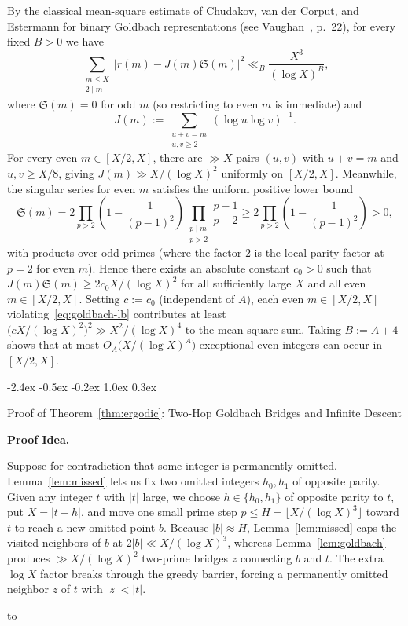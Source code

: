 \documentclass[11pt,a4paper]{article}
\makeatletter
\renewcommand{\section}{\@startsection{section}{1}{\z@}%
  {-2.4ex \@plus -0.5ex \@minus -0.2ex}%
  {1.0ex \@plus 0.3ex}%
  {\Large\bfseries\sffamily\color{ink}\raggedright}}
\theoremstyle{entheorem}
\theoremstyle{enremark}
\renewenvironment{proof}[1][\proofname]{\par
  \pushQED{\qed}%
  \normalfont\topsep5\p@\@plus4\p@\relax
  \trivlist
  \item[\hskip\labelsep\bfseries\sffamily\color{ink}#1\@addpunct{.}]\ignorespaces
}{%
  \popQED\endtrivlist\@endpefalse
}
\newenvironment{ideabox}[1][Proof Idea]{%
  \par\vspace{0.35em}\noindent
  \begin{lrbox}{\ideastore}%
    \begin{minipage}{\dimexpr\linewidth-11pt\relax}%
      \small\setlength{\parskip}{0.35em}%
      {\bfseries\sffamily\color{ink}#1.}\enspace
}{%
    \end{minipage}%
  \end{lrbox}%
  \hbox to \linewidth{%
    {\color{rulegray}\vrule width 2pt}%
    \hspace{9pt}%
    \usebox{\ideastore}%
  }%
  \par\vspace{0.45em}%
}
\makeatother
\begin{document}
\begin{proof}
By the classical mean-square estimate of Chudakov, van der Corput, and Estermann for binary Goldbach representations (see Vaughan~\cite{vaughan1972}, p.~22), for every fixed $B > 0$ we have
\[
  \sum_{\substack{m \le X \\ 2 \mid m}} \bigl|r(m) - J(m)\mathfrak{S}(m)\bigr|^2 \ll_B \frac{X^3}{(\log X)^B},
\]
where $\mathfrak{S}(m) = 0$ for odd $m$ (so restricting to even $m$ is immediate) and
\[
  J(m) := \sum_{\substack{u+v=m \\ u,v \ge 2}} (\log u \log v)^{-1}.
\]
For every even $m \in [X/2, X]$, there are $\gg X$ pairs $(u,v)$ with $u+v=m$ and $u,v \ge X/8$, giving $J(m) \gg X/(\log X)^2$ uniformly on $[X/2, X]$. Meanwhile, the singular series for even $m$ satisfies the uniform positive lower bound
\[
  \mathfrak{S}(m) = 2\prod_{p>2}\left(1 - \frac{1}{(p-1)^2}\right)\prod_{\substack{p \mid m \\ p>2}}\frac{p-1}{p-2} \ge 2\prod_{p>2}\left(1 - \frac{1}{(p-1)^2}\right) > 0,
\]
with products over odd primes (where the factor $2$ is the local parity factor at $p = 2$ for even $m$). Hence there exists an absolute constant $c_0 > 0$ such that $J(m)\mathfrak{S}(m) \ge 2c_0 X/(\log X)^2$ for all sufficiently large $X$ and all even $m \in [X/2, X]$. Setting $c := c_0$ (independent of $A$), each even $m \in [X/2, X]$ violating~\eqref{eq:goldbach-lb} contributes at least $\bigl(cX/(\log X)^2\bigr)^2 \gg X^2/(\log X)^4$ to the mean-square sum. Taking $B := A + 4$ shows that at most $O_A\bigl(X/(\log X)^A\bigr)$ exceptional even integers can occur in $[X/2, X]$.
\end{proof}

\section{Proof of Theorem~\ref{thm:ergodic}: Two-Hop Goldbach Bridges and Infinite Descent}

\begin{ideabox}
Suppose for contradiction that some integer is permanently omitted. Lemma~\ref{lem:missed} lets us fix two omitted integers $h_0, h_1$ of opposite parity. Given any integer $t$ with $|t|$ large, we choose $h \in \{h_0, h_1\}$ of opposite parity to $t$, put $X = |t - h|$, and move one small prime step $p \le H = \lfloor X/(\log X)^3\rfloor$ toward $t$ to reach a new omitted point $b$. Because $|b| \approx H$, Lemma~\ref{lem:missed} caps the visited neighbors of $b$ at $2|b| \ll X/(\log X)^3$, whereas Lemma~\ref{lem:goldbach} produces $\gg X/(\log X)^2$ two-prime bridges $z$ connecting $b$ and $t$. The extra $\log X$ factor breaks through the greedy barrier, forcing a permanently omitted neighbor $z$ of $t$ with $|z| < |t|$.
\end{ideabox}
\end{document}
